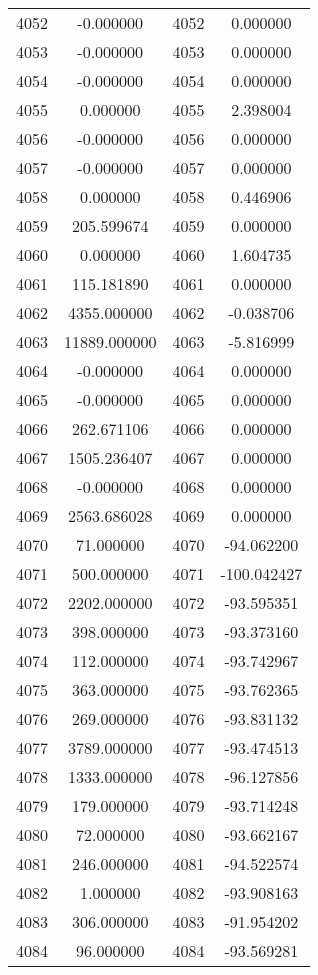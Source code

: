 \documentclass[12pt]{article}
\begin{document}
\begin{longtable}{@{}cccc@{}}
4052 & -0.000000 & 4052 & 0.000000 \\
4053 & -0.000000 & 4053 & 0.000000 \\
4054 & -0.000000 & 4054 & 0.000000 \\
4055 & 0.000000 & 4055 & 2.398004 \\
4056 & -0.000000 & 4056 & 0.000000 \\
4057 & -0.000000 & 4057 & 0.000000 \\
4058 & 0.000000 & 4058 & 0.446906 \\
4059 & 205.599674 & 4059 & 0.000000 \\
4060 & 0.000000 & 4060 & 1.604735 \\
4061 & 115.181890 & 4061 & 0.000000 \\
4062 & 4355.000000 & 4062 & -0.038706 \\
4063 & 11889.000000 & 4063 & -5.816999 \\
4064 & -0.000000 & 4064 & 0.000000 \\
4065 & -0.000000 & 4065 & 0.000000 \\
4066 & 262.671106 & 4066 & 0.000000 \\
4067 & 1505.236407 & 4067 & 0.000000 \\
4068 & -0.000000 & 4068 & 0.000000 \\
4069 & 2563.686028 & 4069 & 0.000000 \\
4070 & 71.000000 & 4070 & -94.062200 \\
4071 & 500.000000 & 4071 & -100.042427 \\
4072 & 2202.000000 & 4072 & -93.595351 \\
4073 & 398.000000 & 4073 & -93.373160 \\
4074 & 112.000000 & 4074 & -93.742967 \\
4075 & 363.000000 & 4075 & -93.762365 \\
4076 & 269.000000 & 4076 & -93.831132 \\
4077 & 3789.000000 & 4077 & -93.474513 \\
4078 & 1333.000000 & 4078 & -96.127856 \\
4079 & 179.000000 & 4079 & -93.714248 \\
4080 & 72.000000 & 4080 & -93.662167 \\
4081 & 246.000000 & 4081 & -94.522574 \\
4082 & 1.000000 & 4082 & -93.908163 \\
4083 & 306.000000 & 4083 & -91.954202 \\
4084 & 96.000000 & 4084 & -93.569281 \\

\end{longtable}
\end{document}
